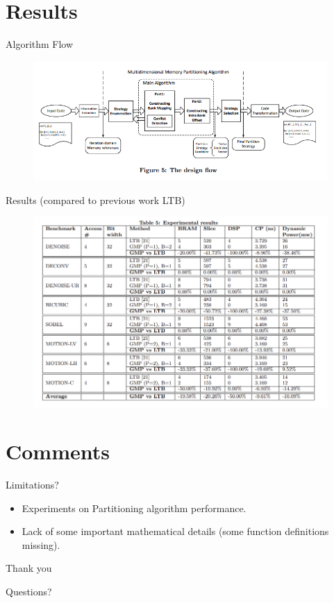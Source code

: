 \documentclass[xcolor=dvipsnames]{beamer}
\begin{document}
    \section{Results}
    \begin{frame}{Algorithm Flow}

        \begin{figure}
            \includegraphics[scale=0.6]{FinalPipeline.PNG}
        \end{figure}
        
    \end{frame}

    \begin{frame}{Results (compared to previous work LTB)}

        \begin{figure}
            \includegraphics[scale=0.6]{Experiment.PNG}
        \end{figure}
        
    \end{frame}

    \section{Comments}
    \begin{frame}{Limitations?}

        \begin{itemize}
            \item Experiments on Partitioning algorithm performance.
            \item Lack of some important mathematical details (some function definitions missing). 
        \end{itemize}
        
    \end{frame}

    \begin{frame}{Thank you}

        Questions?
        
    \end{frame}
\end{document}
